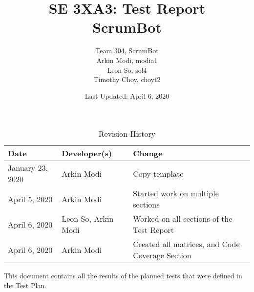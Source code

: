 \documentclass[12pt, titlepage]{article}
\title{SE 3XA3: Test Report\\ScrumBot}
\author{
	Team 304, ScrumBot
		\\ Arkin Modi, modia1
        \\ Leon So, sol4
        \\ Timothy Choy, choyt2
}
\date{Last Updated: April 6, 2020}
\begin{document}
\maketitle

\tableofcontents
\listoftables
\listoffigures

\begin{table}[H]
    \caption{Revision History} \label{TblRevisionHistory}
    \begin{tabularx}{\textwidth}{llX}
        \toprule
            \textbf{Date} & \textbf{Developer(s)} & \textbf{Change}\\
        \midrule
            January 23, 2020 & Arkin Modi & Copy template\\
            April 5, 2020 & Arkin Modi & Started work on multiple sections\\
            April 6, 2020 & Leon So, Arkin Modi & Worked on all sections of the Test Report\\
            April 6, 2020 & Arkin Modi & Created all matrices, and Code Coverage Section\\
        \bottomrule
    \end{tabularx}
\end{table}

\newpage


This document contains all the results of the planned tests that were defined in the Test Plan.
\end{document}
